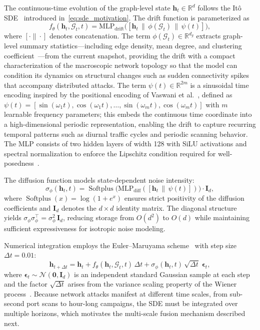 \documentclass[journal]{IEEEtran}
\newcommand{\R}{\mathbb{R}}
\newcommand{\N}{\mathcal{N}}
\newcommand{\G}{\mathcal{G}}
\newcommand{\softplus}{\operatorname{Softplus}}
\begin{document}
The continuous-time evolution of the graph-level state $\mathbf{h}_t \in \R^d$ follows the It\^{o} SDE~\cite{oksendal2003sde} introduced in~\eqref{eq:sde_motivation}. The drift function is parameterized as
\begin{equation}
f_\theta(\mathbf{h}_t, \G_t, t) = \mathrm{MLP}_{\mathrm{drift}}\!\big([\mathbf{h}_t \,\|\, \phi(\G_t) \,\|\, \psi(t)]\big),
\label{eq:drift}
\end{equation}
where $[\cdot \| \cdot]$ denotes concatenation. The term $\phi(\G_t) \in \R^{d_g}$ extracts graph-level summary statistics---including edge density, mean degree, and clustering coefficient~\cite{watts1998collective}---from the current snapshot, providing the drift with a compact characterization of the macroscopic network topology so that the model can condition its dynamics on structural changes such as sudden connectivity spikes that accompany distributed attacks. The term $\psi(t) \in \R^{2m}$ is a sinusoidal time encoding inspired by the positional encoding of Vaswani et al.~\cite{vaswani2017attention}, defined as $\psi(t) = [\sin(\omega_1 t), \cos(\omega_1 t), \ldots, \sin(\omega_m t), \cos(\omega_m t)]$ with $m$ learnable frequency parameters; this embeds the continuous time coordinate into a high-dimensional periodic representation, enabling the drift to capture recurring temporal patterns such as diurnal traffic cycles and periodic scanning behavior. The MLP consists of two hidden layers of width 128 with SiLU activations and spectral normalization to enforce the Lipschitz condition required for well-posedness~\cite{oksendal2003sde}.

The diffusion function models state-dependent noise intensity:
\begin{equation}
\sigma_\phi(\mathbf{h}_t, t) = \softplus\!\big(\mathrm{MLP}_{\mathrm{diff}}([\mathbf{h}_t \,\|\, \psi(t)])\big) \cdot \mathbf{I}_d,
\label{eq:diffusion}
\end{equation}
where $\softplus(x) = \log(1 + e^x)$ ensures strict positivity of the diffusion coefficients and $\mathbf{I}_d$ denotes the $d \times d$ identity matrix. The diagonal structure yields $\sigma_\phi \sigma_\phi^\top = \sigma_\phi^2 \, \mathbf{I}_d$, reducing storage from $O(d^2)$ to $O(d)$ while maintaining sufficient expressiveness for isotropic noise modeling.

Numerical integration employs the Euler--Maruyama scheme~\cite{kloeden1992numerical} with step size $\Delta t = 0.01$:
\begin{equation}
\mathbf{h}_{t+\Delta t} = \mathbf{h}_t + f_\theta(\mathbf{h}_t, \G_t, t)\,\Delta t + \sigma_\phi(\mathbf{h}_t, t)\,\sqrt{\Delta t}\;\boldsymbol{\epsilon}_t,
\label{eq:euler_maruyama}
\end{equation}
where $\boldsymbol{\epsilon}_t \sim \N(\mathbf{0}, \mathbf{I}_d)$ is an independent standard Gaussian sample at each step and the factor $\sqrt{\Delta t}$ arises from the variance scaling property of the Wiener process~\cite{oksendal2003sde}. Because network attacks manifest at different time scales, from sub-second port scans to hour-long campaigns, the SDE must be integrated over multiple horizons, which motivates the multi-scale fusion mechanism described next.
\end{document}
